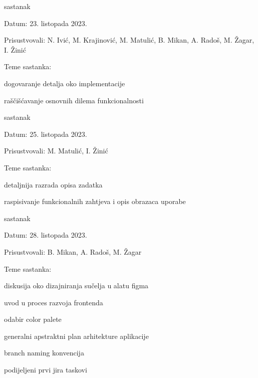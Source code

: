 \begin{packed_enum}
			\item  sastanak
			\item[] \begin{packed_item}
				\item Datum: 23. listopada 2023.
				\item Prisustvovali: N. Ivić, M. Krajinović, M. Matulić, B. Mikan, A. Radoš, M. Žagar, I. Žinić
				\item Teme sastanka:
				\begin{packed_item}
					\item  dogovaranje detalja oko implementacije
					\item  raščišćavanje osnovnih dilema funkcionalnosti 
				\end{packed_item}
			\end{packed_item}

			\item  sastanak
			\item[] \begin{packed_item}
				\item Datum: 25. listopada 2023.
				\item Prisustvovali: M. Matulić, I. Žinić
				\item Teme sastanka:
				\begin{packed_item}
					\item  detaljnija razrada opisa zadatka
					\item  raspisivanje funkcionalnih zahtjeva i opis obrazaca uporabe
				\end{packed_item}
			\end{packed_item}
			
			\item  sastanak
			\item[] \begin{packed_item}
				\item Datum: 28. listopada 2023.
				\item Prisustvovali: B. Mikan, A. Radoš, M. Žagar
				\item Teme sastanka:
				\begin{packed_item}
					\item  diskusija oko dizajniranja sučelja u alatu figma
					\item  uvod u proces razvoja frontenda
					\item  odabir color palete
					\item  generalni apstraktni plan arhitekture aplikacije
					\item  branch naming konvencija
					\item  podijeljeni prvi jira taskovi
				\end{packed_item}
			\end{packed_item}
			

\end{packed_enum}
